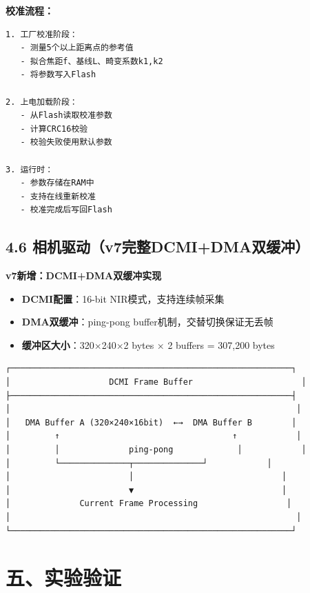 \documentclass[12pt,a4paper]{article}
\begin{document}
\textbf{校准流程：}

\begin{verbatim}
1. 工厂校准阶段：
   - 测量5个以上距离点的参考值
   - 拟合焦距f、基线L、畸变系数k1,k2
   - 将参数写入Flash

2. 上电加载阶段：
   - 从Flash读取校准参数
   - 计算CRC16校验
   - 校验失败使用默认参数

3. 运行时：
   - 参数存储在RAM中
   - 支持在线重新校准
   - 校准完成后写回Flash
\end{verbatim}

\subsection{4.6 相机驱动（v7完整DCMI+DMA双缓冲）}

\textbf{v7新增：DCMI+DMA双缓冲实现}

\begin{itemize}
\item \textbf{DCMI配置}：16-bit NIR模式，支持连续帧采集
\item \textbf{DMA双缓冲}：ping-pong buffer机制，交替切换保证无丢帧
\item \textbf{缓冲区大小}：320×240×2 bytes × 2 buffers = 307,200 bytes
\end{itemize}

\begin{verbatim}
┌─────────────────────────────────────────────────────────┐
│                    DCMI Frame Buffer                      │
├─────────────────────────────────────────────────────────┤
│                                                          │
│   DMA Buffer A (320×240×16bit)  ←→  DMA Buffer B        │
│         ↑                                   ↑            │
│         │              ping-pong             │            │
│         └──────────────┬──────────────┘            │
│                        │                              │
│                        ▼                              │
│              Current Frame Processing                  │
│                                                          │
└─────────────────────────────────────────────────────────┘
\end{verbatim}

\newpage

\section{五、实验验证}
\end{document}
